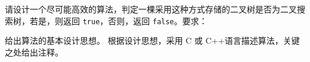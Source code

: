 \begin{qitems}
\begin{bbox}
        \vspace{5mm}
    
        \noindent 请设计一个尽可能高效的算法，判定一棵采用这种方式存储的二叉树是否为二叉搜索树，若是，则返回 \texttt{true}，否则，返回 \texttt{false}。要求：
        \begin{subqitems}
            \subqitem 给出算法的基本设计思想。
            \subqitem 根据设计思想，采用 C 或 C++语言描述算法，关键之处给出注释。
        \end{subqitems}
    \end{bbox}

\end{qitems} 
